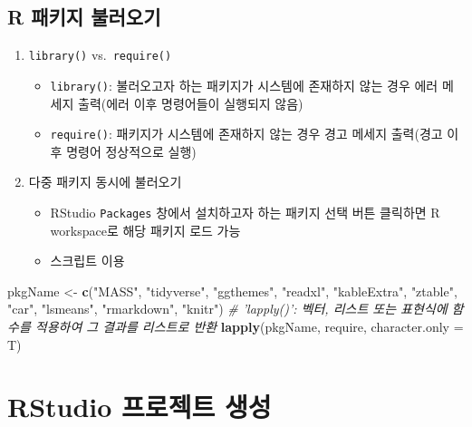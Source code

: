 \documentclass[
  11pt,
]{krantz}
\newenvironment{Shaded}{\begin{snugshade}}{\end{snugshade}}
\newcommand{\CommentTok}[1]{\textcolor[rgb]{0.37,0.37,0.37}{\textit{#1}}}
\newcommand{\DataTypeTok}[1]{\textcolor[rgb]{0.27,0.27,0.27}{#1}}
\newcommand{\KeywordTok}[1]{\textcolor[rgb]{0.27,0.27,0.27}{\textbf{#1}}}
\newcommand{\NormalTok}[1]{#1}
\newcommand{\StringTok}[1]{\textcolor[rgb]{0.5,0.5,0.5}{#1}}
\providecommand{\tightlist}{%
  \setlength{\itemsep}{0pt}\setlength{\parskip}{0pt}}
\begin{document}
\hypertarget{r-package-load}{%
\subsection{R 패키지 불러오기}\label{r-package-load}}

\begin{enumerate}
\def\labelenumi{\arabic{enumi}.}
\tightlist
\item
  \texttt{library()} vs.~\texttt{require()}

  \begin{itemize}
  \tightlist
  \item
    \texttt{library()}: 불러오고자 하는 패키지가 시스템에 존재하지 않는 경우 에러 메세지 출력(에러 이후 명령어들이 실행되지 않음)
  \item
    \texttt{require()}: 패키지가 시스템에 존재하지 않는 경우 경고 메세지 출력(경고 이후 명령어 정상적으로 실행)
  \end{itemize}
\item
  다중 패키지 동시에 불러오기

  \begin{itemize}
  \tightlist
  \item
    RStudio \texttt{Packages} 창에서 설치하고자 하는 패키지 선택 버튼 클릭하면 R workspace로 해당 패키지 로드 가능
  \item
    스크립트 이용
  \end{itemize}
\end{enumerate}

\footnotesize

\begin{Shaded}
\begin{Highlighting}[]
\NormalTok{pkgName <-}\StringTok{ }\KeywordTok{c}\NormalTok{(}\StringTok{"MASS"}\NormalTok{, }\StringTok{"tidyverse"}\NormalTok{, }\StringTok{"ggthemes"}\NormalTok{, }\StringTok{"readxl"}\NormalTok{, }
             \StringTok{"kableExtra"}\NormalTok{, }\StringTok{"ztable"}\NormalTok{, }\StringTok{"car"}\NormalTok{, }\StringTok{"lsmeans"}\NormalTok{, }
             \StringTok{"rmarkdown"}\NormalTok{, }\StringTok{"knitr"}\NormalTok{)}
\CommentTok{# 'lapply()': 벡터, 리스트 또는 표현식에 함수를 적용하여 그 결과를 리스트로 반환}
\KeywordTok{lapply}\NormalTok{(pkgName, require, }\DataTypeTok{character.only =}\NormalTok{ T) }
\end{Highlighting}
\end{Shaded}

\normalsize

\hypertarget{rstudio-create-project}{%
\section{RStudio 프로젝트 생성}\label{rstudio-create-project}}
\end{document}
